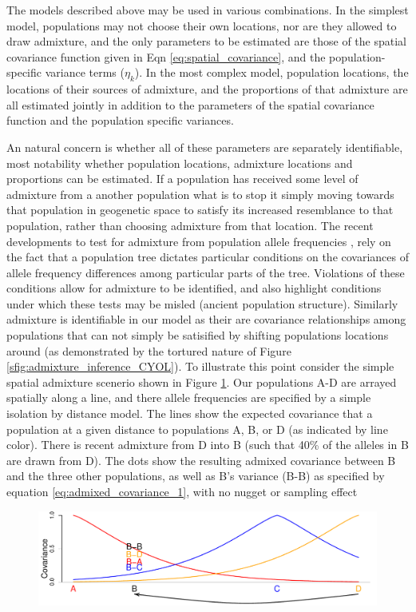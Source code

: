 \documentclass[12pt]{article}
\begin{document}
The models described above may be used in various combinations.  In the simplest model, populations may not choose their own locations, nor are they allowed to draw admixture, and the only parameters to be estimated are those of the spatial covariance function given in Eqn \eqref{eq:spatial_covariance}, and the population-specific variance terms ($\eta_k$).  In the most complex model, population locations, the locations of their sources of admixture, and the proportions of that admixture are all estimated jointly in addition to the parameters of the spatial covariance function and the population specific variances.  %

An natural concern is whether all of these parameters are separately identifiable, most notability whether population locations, admixture locations and proportions can be estimated. If a population has received some level of admixture from a another population what is to stop it simply moving towards that population in geogenetic space to satisfy its increased resemblance to that population, rather than choosing admixture from that location. The recent developments to test for admixture from population allele frequencies \citep{treemix}, rely on the fact that a population tree dictates particular conditions on the covariances of allele frequency differences among particular parts of the tree. Violations of these conditions allow for admixture to be identified, and also highlight conditions under which these tests may be misled (ancient population structure). Similarly admixture is identifiable in our model as their are covariance relationships among populations that can not simply be satisified by shifting populations locations around (as demonstrated by the tortured nature of Figure \ref{sfig:admixture_inference_CYOL}). To illustrate this point consider the simple spatial admixture scenerio shown in Figure \ref{fig:toy_admixture}. Our populations A-D are arrayed spatially along a line, and there allele frequencies are specified by a simple isolation by distance model. The lines show the expected covariance that a population at a given distance to populations A, B, or D (as indicated by line color). There is recent admixture from D into B (such that 40\% of the alleles in B are drawn from D). The dots show the resulting admixed covariance between B and the three other populations, as well as B's variance (B-B) as specified by equation \eqref{eq:admixed_covariance_1}, with no nugget or sampling effect
\begin{figure}[ht!]
	\centering
	\includegraphics[width=\textwidth]{figs/Admix_covar_toy_fig.pdf}
	\caption{} \label{fig:toy_admixture}
\end{figure}
\end{document}
